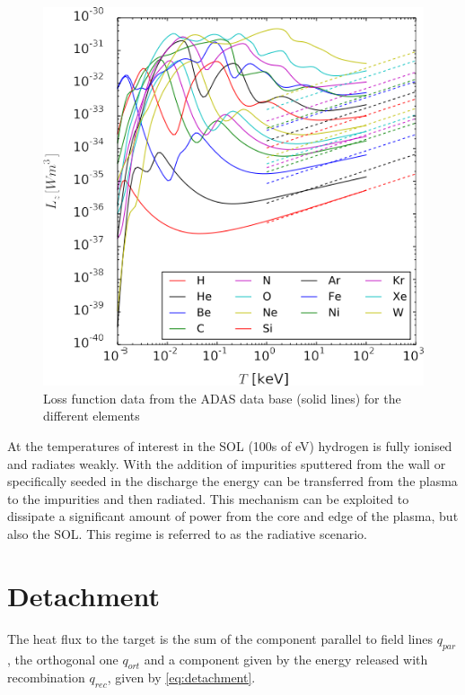 \begin{figure}
	\centering
	\includegraphics[width=\linewidth]{Chapters/chapter1/figs/loss curve.png}
	\caption{Loss function data from the ADAS data base (solid lines) for the different elements \cite{Lux2015}}
	\label{fig:loss_curve}
\end{figure}

At the temperatures of interest in the SOL (100s of eV) hydrogen is fully ionised and radiates weakly. With the addition of impurities sputtered from the wall or specifically seeded in the discharge the energy can be transferred from the plasma to the impurities and then radiated. This mechanism can be exploited to dissipate a significant amount of power from the core and edge of the plasma, but also the SOL. This regime is referred to as the radiative scenario.


\section{Detachment}

The heat flux to the target is the sum of the component parallel to field lines $q_{par}$, the orthogonal one $q_{ort}$ and a component given by the energy released with recombination $q_{rec}$, given by  \autoref{eq:detachment}.

